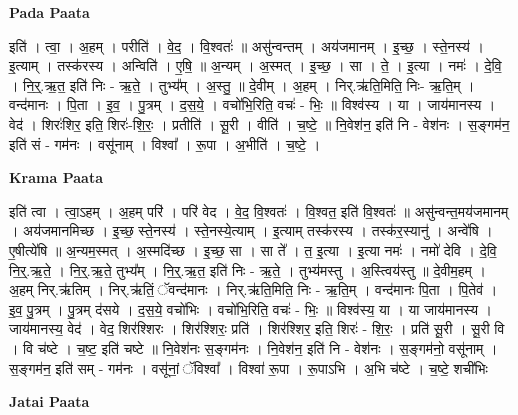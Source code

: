 \documentclass[17pt]{extarticle}
\begin{document}
\textbf{Pada Paata} \newline

इति॑ । त्वा॒ । अ॒हम् । परीति॑ । वे॒द॒ । वि॒श्वतः॑ ॥ असु॑न्वन्तम् । अय॑जमानम् । इ॒च्छ॒ । स्ते॒नस्य॑ । इ॒त्याम् । तस्क॑रस्य । अन्विति॑ । ए॒षि॒ ॥ अ॒न्यम् । अ॒स्मत् । इ॒च्छ॒ । सा । ते॒ । इ॒त्या । नमः॑ । दे॒वि॒ । नि॒र्॒.ऋ॒त॒ इति॑ निः - ऋ॒ते॒ । तुभ्य᳚म् । अ॒स्तु॒ ॥ दे॒वीम् । अ॒हम् । निर्.ऋ॑ति॒मिति॒ निः- ऋ॒ति॒म् । वन्द॑मानः । पि॒ता । इ॒व॒ । पु॒त्रम् । द॒स॒ये॒ । वचो॑भि॒रिति॒ वचः॑ - भिः॒ ॥ विश्व॑स्य । या । जाय॑मानस्य । वेद॑ । शिरः॑शिर॒ इति॒ शिरः॑-शि॒रः॒ । प्रतीति॑ । सू॒री । वीति॑ । च॒ष्टे॒ ॥ नि॒वेश॑न॒ इति॑ नि - वेश॑नः । स॒ङ्गम॑न॒ इति॑ सं - गम॑नः । वसू॑नाम् । विश्वा᳚ । रू॒पा । अ॒भीति॑ । च॒ष्टे॒ ।  \newline


\textbf{Krama Paata} \newline

इति॑ त्वा । त्वा॒ऽहम् । अ॒हम् परि॑ । परि॑ वेद । वे॒द॒ वि॒श्वतः॑ । वि॒श्वत॒ इति॑ वि॒श्वतः॑ ॥ असु॑न्वन्त॒मय॑जमानम् । अय॑जमानमिच्छ । इ॒च्छ॒ स्ते॒नस्य॑ । स्ते॒नस्ये॒त्याम् । इ॒त्याम् तस्क॑रस्य । तस्क॑र॒स्यानु॑ । अन्वे॑षि । ए॒षीत्ये॑षि ॥ अ॒न्यम॒स्मत् । अ॒स्मदि॑च्छ । इ॒च्छ॒ सा । सा ते᳚ । त॒ इ॒त्या । इ॒त्या नमः॑ । नमो॑ देवि । दे॒वि॒ नि॒र्॒.ऋ॒ते॒ । नि॒र्॒.ऋ॒ते॒ तुभ्य᳚म् । नि॒र्॒.ऋ॒त॒ इति॑ निः - ऋ॒ते॒ । तुभ्य॑मस्तु । अ॒स्त्विय॑स्तु ॥ दे॒वीम॒हम् । अ॒हम् निर्.ऋ॑तिम् । निर्.ऋ॑तिं॒ ॅवन्द॑मानः । निर्.ऋ॑ति॒मिति॒ निः - ऋ॒ति॒म् । वन्द॑मानः पि॒ता । पि॒तेव॑ । इ॒व॒ पु॒त्रम् । पु॒त्रम् द॑सये । द॒स॒ये॒ वचो॑भिः । वचो॑भि॒रिति॒ वचः॑ - भिः॒ ॥ विश्व॑स्य॒ या । या जाय॑मानस्य । जाय॑मानस्य॒ वेद॑ । वेद॒ शिर॑श्शिरः । शिर॑श्शिरः॒ प्रति॑ । शिर॑श्शिर॒ इति॒ शिरः॑ - शि॒रः॒ । प्रति॑ सू॒री । सू॒री वि । वि च॑ष्टे । च॒ष्ट॒ इति॑ चष्टे ॥ नि॒वेश॑नः स॒ङ्गम॑नः । नि॒वेश॑न॒ इति॑ नि - वेश॑नः । स॒ङ्गम॑नो॒ वसू॑नाम् । स॒ङ्गम॑न॒ इति॑ सम् - गम॑नः । वसू॑नां॒ ॅविश्वा᳚ । विश्वा॑ रू॒पा । रू॒पाऽभि । अ॒भि च॑ष्टे । च॒ष्टे॒ शची॑भिः \newline

\textbf{Jatai Paata} \newline
\end{document}
